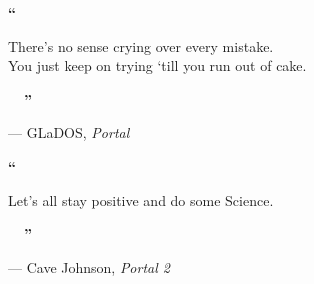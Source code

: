 \thispagestyle{empty}


\begin{center}

\Huge{\textbf{\textcolor{sections}{``~~}}}

\LARGE{There's no sense crying over every mistake. \\ You just keep on trying `till you run out of cake.}

\vspace{0.3cm}
\Huge{\textbf{\textcolor{sections}{~~''}}}

\end{center}

\vspace{-0.7cm} \hspace{8cm}
\large{ --- GLaDOS, \textit{Portal}}


\vspace{3cm}

\begin{center}

\Huge{\textbf{\textcolor{sections}{``~~}}}

\LARGE{Let's all stay positive and do some Science.}

\vspace{0.3cm}
\Huge{\textbf{\textcolor{sections}{~~''}}}

\end{center}

\vspace{-0.7cm} \hspace{8cm}
\large{ --- Cave Johnson, \textit{Portal 2}}

